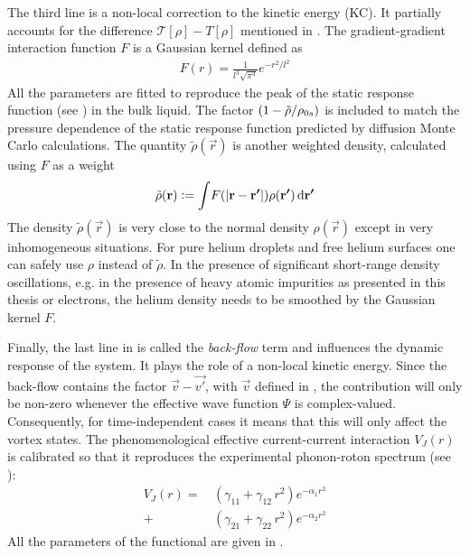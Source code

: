 		The third line is a non-local correction to the kinetic energy (KC). It partially accounts for the difference $\mathcal{T}[\rho]-T[\rho]$ mentioned in . The gradient-gradient interaction function $F$ is a Gaussian kernel defined as
		\begin{align}
			F(r) = \frac{1}{l^3\sqrt{\pi^3}}\unit{e}^{-r^2/l^2}
		\end{align}
		All the parameters are fitted to reproduce the peak of the static response function (see ) in the bulk liquid. The factor $\qty(1-\tilde{\rho}/\rho_{0s})$ is included to match the pressure dependence of the static response function predicted by diffusion Monte Carlo calculations\citep{Moroni1992}. The quantity $\tilde{\rho}(\vec{r})$ is another weighted density, calculated using $F$ as a weight
		\begin{align}
			\tilde{\rho}(\bm{\mathrm{r}}) \vcentcolon= \int\!F\qty(\abs{\bm{\mathrm{r}}-\bm{\mathrm{r'}}})\rho(\bm{\mathrm{r'}})\,\mathrm{d}{\bm{\mathrm{r'}}}
		\end{align}
		The density $\tilde{\rho}(\vec{r})$ is very close to the normal density $\rho(\vec{r})$ except in very inhomogeneous situations. For pure helium droplets and free helium surfaces one can safely use $\rho$ instead of $\tilde{\rho}$. In the presence of significant short-range density oscillations, e.g. in the presence of heavy atomic impurities as presented in this thesis or electrons, the helium density needs to be smoothed by the Gaussian kernel $F$.  
			
		Finally, the last line in  is called the \emph{back-flow} term and influences the dynamic response of the system. It plays the role of a non-local kinetic energy. Since the back-flow contains the factor $\vec{v}-\vec{v'}$, with $\vec{v}$ defined in , the contribution will only be non-zero whenever the effective wave function $\Psi$ is complex-valued. Consequently, for time-independent cases it means that this will only affect the vortex states. The phenomenological effective current-current interaction $V_J(r)$ is calibrated so that it reproduces the experimental phonon-roton spectrum (see ):
		\begin{align}
			V_J(r) =\,&(\gamma_{11} +\gamma_{12} \, r^2) e^{-\alpha_1 r^2} \nonumber \\
				+\,&(\gamma_{21} +\gamma_{22} \, r^2) e^{-\alpha_2 r^2}
		\end{align}
		All the parameters of the functional are given in .

